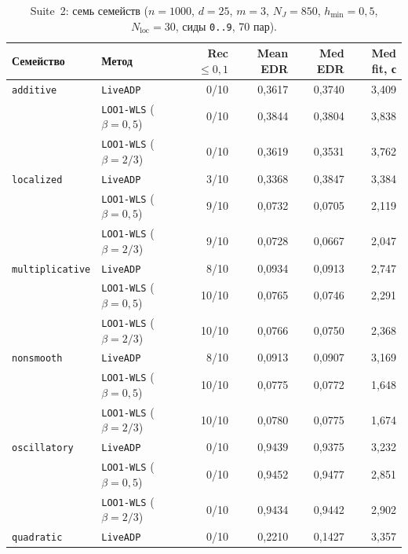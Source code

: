 \documentclass[11pt,a4paper]{article}
\numberwithin{equation}{section}
\theoremstyle{definition}
\theoremstyle{remark}
\begin{document}
\begin{table}[htbp]
\centering
\caption{Suite~2: семь семейств ($n=1000$, $d=25$, $m=3$, $N_J=850$, $h_{\min}=0{,}5$, $N_{\mathrm{loc}}=30$, сиды \texttt{0..9}, 70 пар).}
\label{tab:suite2}
\footnotesize
\setlength{\tabcolsep}{5pt}
\begin{tabular}{@{}llrrrr@{}}
\toprule
Семейство & Метод & Rec $\le 0{,}1$ & Mean EDR & Med EDR & Med fit, с \\
\midrule
\texttt{additive}       & \texttt{LiveADP}              & 0/10 & 0,3617 & 0,3740 & 3,409 \\
                        & \texttt{LOO1-WLS} ($\beta=0{,}5$) & 0/10 & 0,3844 & 0,3804 & 3,838 \\
                        & \texttt{LOO1-WLS} ($\beta=2/3$)   & 0/10 & 0,3619 & 0,3531 & 3,762 \\
\addlinespace[2pt]
\texttt{localized}      & \texttt{LiveADP}              & 3/10 & 0,3368 & 0,3847 & 3,384 \\
                        & \texttt{LOO1-WLS} ($\beta=0{,}5$) & 9/10 & 0,0732 & 0,0705 & 2,119 \\
                        & \texttt{LOO1-WLS} ($\beta=2/3$)   & 9/10 & 0,0728 & 0,0667 & 2,047 \\
\addlinespace[2pt]
\texttt{multiplicative} & \texttt{LiveADP}              & 8/10 & 0,0934 & 0,0913 & 2,747 \\
                        & \texttt{LOO1-WLS} ($\beta=0{,}5$) & 10/10 & 0,0765 & 0,0746 & 2,291 \\
                        & \texttt{LOO1-WLS} ($\beta=2/3$)   & 10/10 & 0,0766 & 0,0750 & 2,368 \\
\addlinespace[2pt]
\texttt{nonsmooth}      & \texttt{LiveADP}              & 8/10 & 0,0913 & 0,0907 & 3,169 \\
                        & \texttt{LOO1-WLS} ($\beta=0{,}5$) & 10/10 & 0,0775 & 0,0772 & 1,648 \\
                        & \texttt{LOO1-WLS} ($\beta=2/3$)   & 10/10 & 0,0780 & 0,0775 & 1,674 \\
\addlinespace[2pt]
\texttt{oscillatory}    & \texttt{LiveADP}              & 0/10 & 0,9439 & 0,9375 & 3,232 \\
                        & \texttt{LOO1-WLS} ($\beta=0{,}5$) & 0/10 & 0,9452 & 0,9477 & 2,851 \\
                        & \texttt{LOO1-WLS} ($\beta=2/3$)   & 0/10 & 0,9434 & 0,9442 & 2,902 \\
\addlinespace[2pt]
\texttt{quadratic}      & \texttt{LiveADP}              & 0/10 & 0,2210 & 0,1427 & 3,357 \\

\end{tabular}
\end{table}
\end{document}
